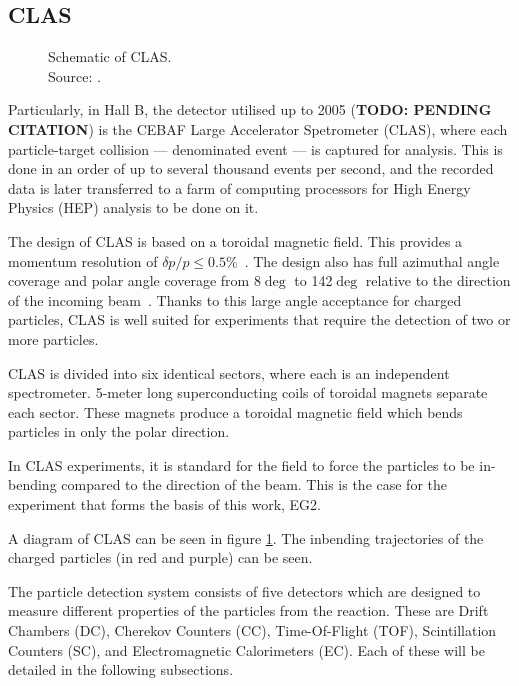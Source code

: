 \subsection{CLAS} \label{ssec::clas}
    \begin{figure}[htbp]
        \centering
        \caption{\label{fig::clas} Schematic of CLAS. \\
        Source: \cite{bedlinskiy2014pi0}.}
    \end{figure}

    Particularly, in Hall B, the detector utilised up to 2005 (\textbf{TODO: PENDING CITATION}) is the CEBAF Large Accelerator Spetrometer (CLAS), where each particle-target collision --- denominated event --- is captured for analysis.
    This is done in an order of up to several thousand events per second, and the recorded data is later transferred to a farm of computing processors
    for High Energy Physics (HEP) analysis to be done on it.

    The design of CLAS is based on a toroidal magnetic field.
    This provides a momentum resolution of $\delta p/p \leq 0.5\%$~\cite{mestayer2000dc}.
    The design also has full azimuthal angle coverage and polar angle coverage from 8$\deg$ to 142$\deg$ relative to the direction of the incoming beam~\cite{mecking2003cebaf}.
    Thanks to this large angle acceptance for charged particles, CLAS is well suited for experiments that require the detection of two or more particles.
    
    CLAS is divided into six identical sectors, where each is an independent spectrometer.
    5-meter long superconducting coils of toroidal magnets separate each sector.
    These magnets produce a toroidal magnetic field which bends particles in only the polar direction.
    
    In CLAS experiments, it is standard for the field to force the particles to be in-bending compared to the direction of the beam.
    This is the case for the experiment that forms the basis of this work, EG2.
    
    A diagram of CLAS can be seen in figure \ref{fig::clas}.
    The inbending trajectories of the charged particles (in red and purple) can be seen.

    The particle detection system consists of five detectors which are designed to measure different properties of the particles from the reaction.
    These are Drift Chambers (DC), Cherekov Counters (CC), Time-Of-Flight (TOF), Scintillation Counters (SC), and Electromagnetic Calorimeters (EC).
    Each of these will be detailed in the following subsections.
    
    
    
    
    
